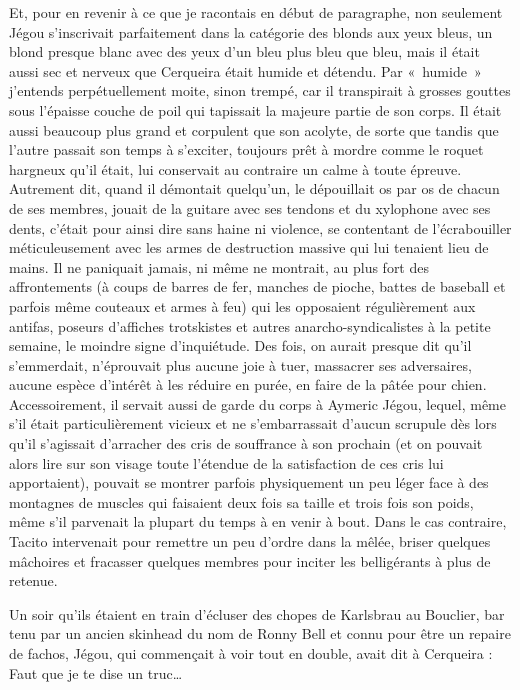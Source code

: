 Et, pour en revenir à ce que je racontais en début de paragraphe, non seulement Jégou s’inscrivait parfaitement dans la catégorie des blonds aux yeux bleus, un blond presque blanc avec des yeux d’un bleu plus bleu que bleu, mais il était aussi sec et nerveux que Cerqueira était humide et détendu. Par «~humide~» j’entends perpétuellement moite, sinon trempé, car il transpirait à grosses gouttes sous l’épaisse couche de poil qui tapissait la majeure partie de son corps. Il était aussi beaucoup plus grand et corpulent que son acolyte, de sorte que tandis que l’autre passait son temps à s’exciter, toujours prêt à mordre comme le roquet hargneux qu’il était, lui conservait au contraire un calme à toute épreuve. Autrement dit, quand il démontait quelqu’un, le dépouillait os par os de chacun de ses membres, jouait de la guitare avec ses tendons et du xylophone avec ses dents, c’était pour ainsi dire sans haine ni violence, se contentant de l’écrabouiller méticuleusement avec les armes de destruction massive qui lui tenaient lieu de mains. Il ne paniquait jamais, ni même ne montrait, au plus fort des affrontements (à coups de barres de fer, manches de pioche, battes de baseball et parfois même couteaux et armes à feu) qui les opposaient régulièrement aux antifas, poseurs d’affiches trotskistes et autres anarcho-syndicalistes à la petite semaine, le moindre signe d’inquiétude. Des fois, on aurait presque dit qu’il s’emmerdait, n’éprouvait plus aucune joie à tuer, massacrer ses adversaires, aucune espèce d’intérêt à les réduire en purée, en faire de la pâtée pour chien. Accessoirement, il servait aussi de garde du corps à Aymeric Jégou, lequel, même s’il était particulièrement vicieux et ne s’embarrassait d’aucun scrupule dès lors qu’il s’agissait d’arracher des cris de souffrance à son prochain (et on pouvait alors lire sur son visage toute l’étendue de la satisfaction de ces cris lui apportaient), pouvait se montrer parfois physiquement un peu léger face à des montagnes de muscles qui faisaient deux fois sa taille et trois fois son poids, même s’il parvenait la plupart du temps à en venir à bout. Dans le cas contraire, Tacito intervenait pour remettre un peu d’ordre dans la mêlée, briser quelques mâchoires et fracasser quelques membres pour inciter les belligérants à plus de retenue.

Un soir qu’ils étaient en train d’écluser des chopes de Karlsbrau au Bouclier, bar tenu par un ancien skinhead du nom de Ronny Bell et connu pour être un repaire de fachos, Jégou, qui commençait à voir tout en double, avait dit à Cerqueira : Faut que je te dise un truc…

